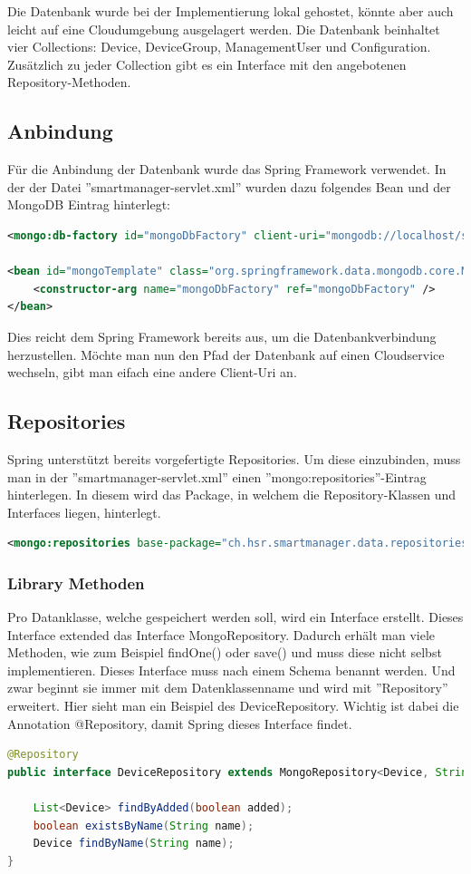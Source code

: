 Die Datenbank wurde bei der Implementierung lokal gehostet, könnte aber auch leicht auf eine Cloudumgebung ausgelagert werden. Die Datenbank beinhaltet vier Collections: Device, DeviceGroup, ManagementUser und Configuration. Zusätzlich zu jeder Collection gibt es ein Interface mit den angebotenen Repository-Methoden.
\subsection{Anbindung}
Für die Anbindung der Datenbank wurde das Spring Framework verwendet. In der der Datei ''smartmanager-servlet.xml'' wurden dazu folgendes Bean und der MongoDB Eintrag hinterlegt:
\begin{lstlisting}[language=xml]
<mongo:db-factory id="mongoDbFactory" client-uri="mongodb://localhost/smartmanager" />

<bean id="mongoTemplate" class="org.springframework.data.mongodb.core.MongoTemplate">
	<constructor-arg name="mongoDbFactory" ref="mongoDbFactory" />
</bean>
\end{lstlisting}
Dies reicht dem Spring Framework bereits aus, um die Datenbankverbindung herzustellen. Möchte man nun den Pfad der Datenbank auf einen Cloudservice wechseln, gibt man eifach eine andere Client-Uri an.

\subsection{Repositories}
Spring unterstützt bereits vorgefertigte Repositories. Um diese einzubinden, muss man in der ''smartmanager-servlet.xml'' einen ''mongo:repositories''-Eintrag hinterlegen. In diesem wird das Package, in welchem die Repository-Klassen und Interfaces liegen, hinterlegt.
\begin{lstlisting}[language=xml]
<mongo:repositories base-package="ch.hsr.smartmanager.data.repositories" />
\end{lstlisting}

\subsubsection{Library Methoden}
Pro Datanklasse, welche gespeichert werden soll, wird ein Interface erstellt. Dieses Interface extended das Interface MongoRepository. Dadurch erhält man viele Methoden, wie zum Beispiel findOne() oder save() und muss diese nicht selbst implementieren. Dieses Interface muss nach einem Schema benannt werden. Und zwar beginnt sie immer mit dem Datenklassenname und wird mit ''Repository'' erweitert. Hier sieht man ein Beispiel des DeviceRepository. Wichtig ist dabei die Annotation @Repository, damit Spring dieses Interface findet. 
\begin{lstlisting}[language=java]
@Repository
public interface DeviceRepository extends MongoRepository<Device, String>, DeviceRepositoryCustom {
	
	List<Device> findByAdded(boolean added);
	boolean existsByName(String name);
	Device findByName(String name);
}
\end{lstlisting}

